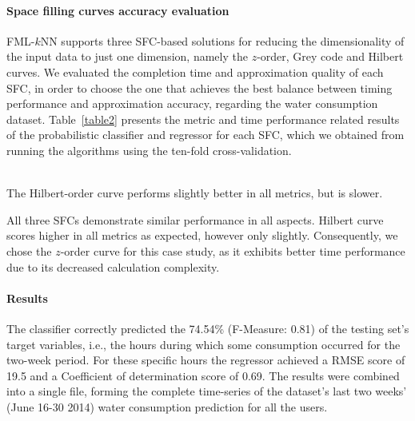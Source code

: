 \paragraph{Space filling curves accuracy evaluation}
\label{par:sfc_eval}
FML-$k$NN supports three SFC-based solutions for reducing the dimensionality of the input data to just one dimension, namely the $z$-order, Grey code and Hilbert curves. We evaluated the completion time and approximation quality of each SFC, in order to choose the one that achieves the best balance between timing performance and approximation accuracy, regarding the water consumption dataset. Table~\ref{table2} presents the metric and time performance related results of the probabilistic classifier and regressor for each SFC, which we obtained from running the algorithms using the ten-fold cross-validation.

\begin{table}[h!]
\caption{Space Filling Curves' performance.}
\label{table2}
\\[6pt]
The Hilbert-order curve performs slightly better in all metrics, but is slower.
\end{table}

All three SFCs demonstrate similar performance in all aspects. Hilbert curve scores higher in all metrics as expected, however only slightly. Consequently, we chose the $z$-order curve for this case study, as it exhibits better time performance due to its decreased calculation complexity.

\paragraph{Results}
\label{par:res1}
The classifier correctly predicted the 74.54\% (F-Measure: 0.81) of the testing set's target variables, i.e., the hours during which some consumption occurred for the two-week period. For these specific hours the regressor achieved a RMSE score of 19.5 and a Coefficient of determination score of 0.69. The results were combined into a single file, forming the complete time-series of the dataset's last two weeks' (June 16-30 2014) water consumption prediction for all the users. 

